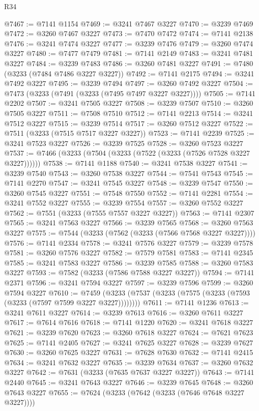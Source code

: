 \begin{lexlean}{R34}
\begin{coremodule}
@7467 := @7141 @1154
@7469 := @3241 @7467 @3227
@7470 := @3239 @7469
@7472 := @3260 @7467 @3227
@7473 := @7470 @7472
@7474 := @7141 @2138
@7476 := @3241 @7474 @3227
@7477 := @3239 @7476
@7479 := @3260 @7474 @3227
@7480 := @7477 @7479
@7481 := @7141 @2149
@7483 := @3241 @7481 @3227
@7484 := @3239 @7483
@7486 := @3260 @7481 @3227
@7491 := @7480 (@3233 (@7484 @7486 @3227 @3227))
@7492 := @7141 @2175
@7494 := @3241 @7492 @3227
@7495 := @3239 @7494
@7497 := @3260 @7492 @3227
@7504 := @7473 (@3233 (@7491 (@3233 (@7495 @7497 @3227 @3227))))
@7505 := @7141 @2202
@7507 := @3241 @7505 @3227
@7508 := @3239 @7507
@7510 := @3260 @7505 @3227
@7511 := @7508 @7510
@7512 := @7141 @2213
@7514 := @3241 @7512 @3227
@7515 := @3239 @7514
@7517 := @3260 @7512 @3227
@7522 := @7511 (@3233 (@7515 @7517 @3227 @3227))
@7523 := @7141 @2239
@7525 := @3241 @7523 @3227
@7526 := @3239 @7525
@7528 := @3260 @7523 @3227
@7537 := @7466 (@3233 (@7504 (@3233 (@7522 (@3233 (@7526 @7528 @3227 @3227))))))
@7538 := @7141 @1188
@7540 := @3241 @7538 @3227
@7541 := @3239 @7540
@7543 := @3260 @7538 @3227
@7544 := @7541 @7543
@7545 := @7141 @2270
@7547 := @3241 @7545 @3227
@7548 := @3239 @7547
@7550 := @3260 @7545 @3227
@7551 := @7548 @7550
@7552 := @7141 @2281
@7554 := @3241 @7552 @3227
@7555 := @3239 @7554
@7557 := @3260 @7552 @3227
@7562 := @7551 (@3233 (@7555 @7557 @3227 @3227))
@7563 := @7141 @2307
@7565 := @3241 @7563 @3227
@7566 := @3239 @7565
@7568 := @3260 @7563 @3227
@7575 := @7544 (@3233 (@7562 (@3233 (@7566 @7568 @3227 @3227))))
@7576 := @7141 @2334
@7578 := @3241 @7576 @3227
@7579 := @3239 @7578
@7581 := @3260 @7576 @3227
@7582 := @7579 @7581
@7583 := @7141 @2345
@7585 := @3241 @7583 @3227
@7586 := @3239 @7585
@7588 := @3260 @7583 @3227
@7593 := @7582 (@3233 (@7586 @7588 @3227 @3227))
@7594 := @7141 @2371
@7596 := @3241 @7594 @3227
@7597 := @3239 @7596
@7599 := @3260 @7594 @3227
@7610 := @7459 (@3233 (@7537 (@3233 (@7575 (@3233 (@7593 (@3233 (@7597 @7599 @3227 @3227))))))))
@7611 := @7141 @1236
@7613 := @3241 @7611 @3227
@7614 := @3239 @7613
@7616 := @3260 @7611 @3227
@7617 := @7614 @7616
@7618 := @7141 @1220
@7620 := @3241 @7618 @3227
@7621 := @3239 @7620
@7623 := @3260 @7618 @3227
@7624 := @7621 @7623
@7625 := @7141 @2405
@7627 := @3241 @7625 @3227
@7628 := @3239 @7627
@7630 := @3260 @7625 @3227
@7631 := @7628 @7630
@7632 := @7141 @2415
@7634 := @3241 @7632 @3227
@7635 := @3239 @7634
@7637 := @3260 @7632 @3227
@7642 := @7631 (@3233 (@7635 @7637 @3227 @3227))
@7643 := @7141 @2440
@7645 := @3241 @7643 @3227
@7646 := @3239 @7645
@7648 := @3260 @7643 @3227
@7655 := @7624 (@3233 (@7642 (@3233 (@7646 @7648 @3227 @3227))))

\end{coremodule}
\end{lexlean}
